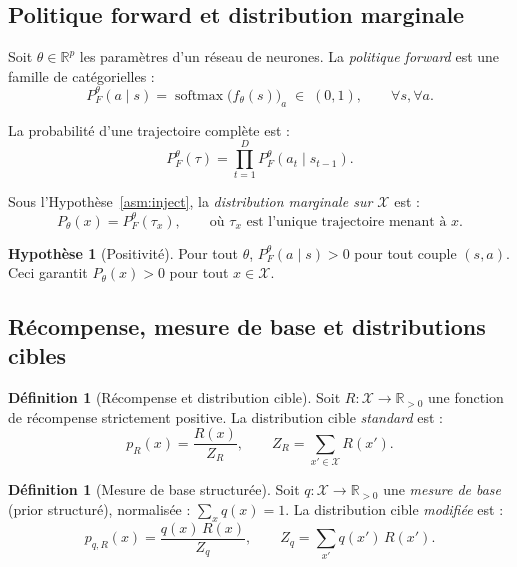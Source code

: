 \documentclass[11pt,a4paper]{article}
\theoremstyle{plain}
\theoremstyle{definition}
\newtheorem{definition}[theorem]{Définition}
\newtheorem{assumption}[theorem]{Hypothèse}
\theoremstyle{remark}
\newcommand{\R}{\mathbb{R}}
\newcommand{\calX}{\mathcal{X}}
\newcommand{\pF}{P_F}
\newcommand{\pth}{P_\theta}
\newcommand{\pR}{p_R}
\begin{document}
\subsection{Politique forward et distribution marginale}

Soit $\theta \in \R^p$ les paramètres d'un réseau de neurones.
La \emph{politique forward} est une famille de catégorielles :
\begin{equation}
  \pF^\theta(a \mid s) = \operatorname{softmax}\bigl(f_\theta(s)\bigr)_a
  \;\in\; (0,1), \qquad \forall s, \forall a.
\end{equation}

La probabilité d'une trajectoire complète est :
\begin{equation}
  \pF^\theta(\tau) = \prod_{t=1}^{D} \pF^\theta(a_t \mid s_{t-1}).
\end{equation}

Sous l'Hypothèse~\ref{asm:inject}, la \emph{distribution marginale sur $\calX$} est :
\begin{equation}
  \pth(x) = \pF^\theta(\tau_x), \qquad \text{où } \tau_x \text{ est l'unique trajectoire menant à } x.
\end{equation}

\begin{assumption}[Positivité]
\label{asm:pos}
Pour tout $\theta$, $\pF^\theta(a \mid s) > 0$ pour tout couple $(s,a)$.
Ceci garantit $\pth(x) > 0$ pour tout $x \in \calX$.
\end{assumption}

\subsection{Récompense, mesure de base et distributions cibles}

\begin{definition}[Récompense et distribution cible]
Soit $R : \calX \to \R_{>0}$ une fonction de récompense strictement positive.
La distribution cible \emph{standard} est :
\begin{equation}
  \pR(x) = \frac{R(x)}{Z_R}, \qquad Z_R = \sum_{x' \in \calX} R(x').
\end{equation}
\end{definition}

\begin{definition}[Mesure de base structurée]
\label{def:base}
Soit $q : \calX \to \R_{>0}$ une \emph{mesure de base} (prior structuré),
normalisée : $\sum_{x} q(x) = 1$.
La distribution cible \emph{modifiée} est :
\begin{equation}
  p_{q,R}(x) = \frac{q(x)\,R(x)}{Z_q}, \qquad Z_q = \sum_{x'} q(x')\,R(x').
\end{equation}
\end{definition}
\end{document}
